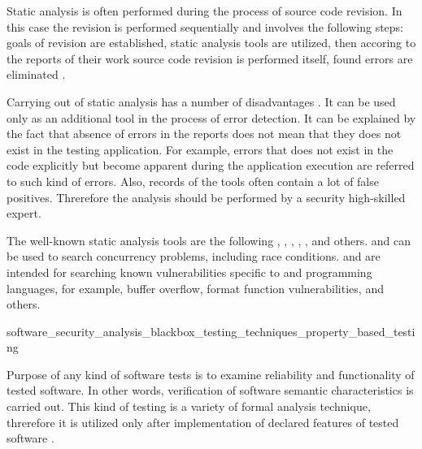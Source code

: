 %
Static analysis is often performed during the process of source code revision. 
%
In this case the revision is performed sequentially and involves the following steps: goals of revision are established, static analysis tools are utilized, then accoring to the reports of their work source code revision is performed itself, found errors are eliminated . 

%
Carrying out of static analysis has a number of disadvantages  . 
%
It can be used only as an additional tool in the process of error detection. 
%
It can be explained by the fact that absence of errors in the reports does not mean that they does not exist in the testing application. 
%
For example, errors that does not exist in the code explicitly but become apparent during the application execution are referred to such kind of errors. 
%
Also, records of the tools often contain a lot of false positives. 
%
Threrefore the analysis should be performed by a security high-skilled expert. 

%
The well-known static analysis tools are the following  ,  ,  ,  ,  , and others.
%
 and  can be used to search concurrency problems, including race conditions. 
%
 and  are intended for searching known vulnerabilities specific to  and  programming languages, for example, buffer overflow, format function vulnerabilities, and others. 


	{software_security_analysis_blackbox_testing_techniques_property_based_testing}

%
Purpose of any kind of software tests is to examine reliability and functionality of tested software. 
%
In other words, verification of software semantic characteristics is carried out. 
%
This kind of testing is a variety of formal analysis technique, threrefore it is utilized only after implementation of declared features of tested software . 

